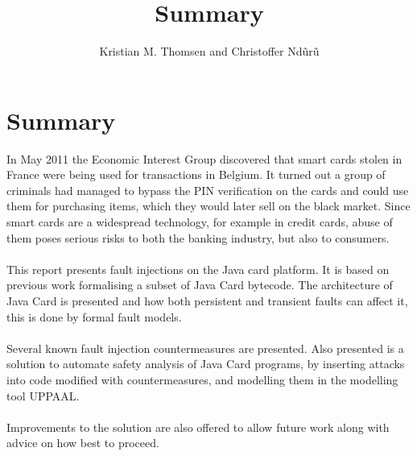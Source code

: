 \documentclass{article}
\begin{document}
\title{Summary}
\author{Kristian M. Thomsen and Christoffer Nd\~ur\~u}
\maketitle

\section{Summary}
In May 2011 the Economic Interest Group discovered that smart cards stolen in France were being used for transactions in Belgium. It turned out a group of criminals had managed to bypass the PIN verification on the cards and could use them for purchasing items, which they would later sell on the black market. Since smart cards are a widespread technology, for example in credit cards, abuse of them poses serious risks to both the banking industry, but also to consumers.\\\\
This report presents fault injections on the Java card platform. It is based on previous work formalising a subset of Java Card bytecode. The architecture of Java Card is presented and how both persistent and transient faults can affect it, this is done by formal fault models.\\\\

Several known fault injection countermeasures are presented. Also presented is a solution to automate safety analysis of Java Card programs, by inserting attacks into code modified with countermeasures, and modelling them in the modelling tool UPPAAL.\\\\
Improvements to the solution are also offered to allow future work along with advice on how best to proceed.
\end{document}
